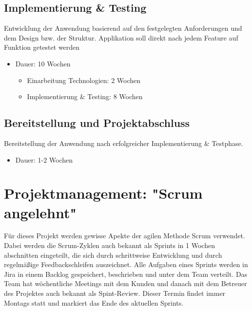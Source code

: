 \documentclass[a4paper,12pt]{article}
\begin{document}

\subsection{Implementierung \& Testing}
Entwicklung der Anwendung basierend auf den festgelegten Anforderungen und dem Design bzw. der Struktur. Applikation soll direkt nach jedem Feature auf Funktion getestet werden
\begin{itemize}
    \item Dauer: 10 Wochen
    \begin{itemize}
        \item Einarbeitung Technologien: 2 Wochen
        \item Implementierung \& Testing: 8 Wochen
    \end{itemize}
\end{itemize}


\subsection{Bereitstellung und Projektabschluss}
Bereitstellung der Anwendung nach erfolgreicher Implementierung \& Testphase.
\begin{itemize}
    \item Dauer: 1-2 Wochen
\end{itemize}

\newpage


\section{Projektmanagement: "Scrum angelehnt"}
Für dieses Projekt werden gewisse Apekte der agilen Methode Scrum verwendet. Dabei werden die Scrum-Zyklen auch bekannt als Sprints in 1 Wochen abschnitten eingeteilt, die sich durch schrittweise Entwicklung und durch regelmäßige Feedbackschleifen auszeichnet. Alle Aufgaben eines Sprints werden in Jira in einem Backlog gespeichert, beschrieben und unter dem Team verteilt. Das Team hat wöchentliche Meetings mit dem Kunden und danach mit dem Betreuer des Projektes auch bekannt als Spint-Review. Dieser Termin findet immer Montags statt und markiert das Ende des aktuellen Sprints.
\end{document}
